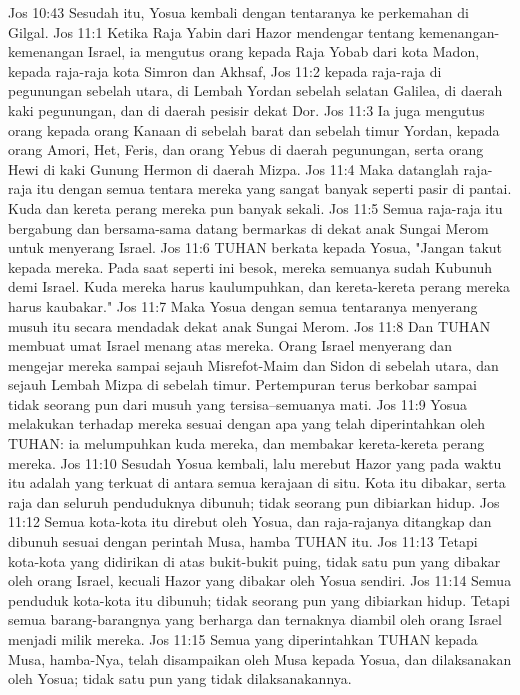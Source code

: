 Jos 10:43  Sesudah itu, Yosua kembali dengan tentaranya ke perkemahan di Gilgal.
Jos 11:1  Ketika Raja Yabin dari Hazor mendengar tentang kemenangan-kemenangan Israel, ia mengutus orang kepada Raja Yobab dari kota Madon, kepada raja-raja kota Simron dan Akhsaf,
Jos 11:2  kepada raja-raja di pegunungan sebelah utara, di Lembah Yordan sebelah selatan Galilea, di daerah kaki pegunungan, dan di daerah pesisir dekat Dor.
Jos 11:3  Ia juga mengutus orang kepada orang Kanaan di sebelah barat dan sebelah timur Yordan, kepada orang Amori, Het, Feris, dan orang Yebus di daerah pegunungan, serta orang Hewi di kaki Gunung Hermon di daerah Mizpa.
Jos 11:4  Maka datanglah raja-raja itu dengan semua tentara mereka yang sangat banyak seperti pasir di pantai. Kuda dan kereta perang mereka pun banyak sekali.
Jos 11:5  Semua raja-raja itu bergabung dan bersama-sama datang bermarkas di dekat anak Sungai Merom untuk menyerang Israel.
Jos 11:6  TUHAN berkata kepada Yosua, "Jangan takut kepada mereka. Pada saat seperti ini besok, mereka semuanya sudah Kubunuh demi Israel. Kuda mereka harus kaulumpuhkan, dan kereta-kereta perang mereka harus kaubakar."
Jos 11:7  Maka Yosua dengan semua tentaranya menyerang musuh itu secara mendadak dekat anak Sungai Merom.
Jos 11:8  Dan TUHAN membuat umat Israel menang atas mereka. Orang Israel menyerang dan mengejar mereka sampai sejauh Misrefot-Maim dan Sidon di sebelah utara, dan sejauh Lembah Mizpa di sebelah timur. Pertempuran terus berkobar sampai tidak seorang pun dari musuh yang tersisa--semuanya mati.
Jos 11:9  Yosua melakukan terhadap mereka sesuai dengan apa yang telah diperintahkan oleh TUHAN: ia melumpuhkan kuda mereka, dan membakar kereta-kereta perang mereka.
Jos 11:10  Sesudah Yosua kembali, lalu merebut Hazor yang pada waktu itu adalah yang terkuat di antara semua kerajaan di situ. Kota itu dibakar, serta raja dan seluruh penduduknya dibunuh; tidak seorang pun dibiarkan hidup.
Jos 11:12  Semua kota-kota itu direbut oleh Yosua, dan raja-rajanya ditangkap dan dibunuh sesuai dengan perintah Musa, hamba TUHAN itu.
Jos 11:13  Tetapi kota-kota yang didirikan di atas bukit-bukit puing, tidak satu pun yang dibakar oleh orang Israel, kecuali Hazor yang dibakar oleh Yosua sendiri.
Jos 11:14  Semua penduduk kota-kota itu dibunuh; tidak seorang pun yang dibiarkan hidup. Tetapi semua barang-barangnya yang berharga dan ternaknya diambil oleh orang Israel menjadi milik mereka.
Jos 11:15  Semua yang diperintahkan TUHAN kepada Musa, hamba-Nya, telah disampaikan oleh Musa kepada Yosua, dan dilaksanakan oleh Yosua; tidak satu pun yang tidak dilaksanakannya.
